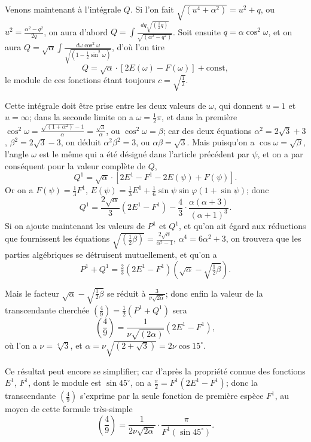 \documentclass{article}
\begin{document}
Venons maintenant à l'intégrale $Q$. Si l'on fait $\sqrt{(u^{4}+\alpha^{2})}=u^{2}+q$, ou $u^{2}=\frac{\alpha^{2}-q^{2}}{2q}$, on aura d'abord $Q=\displaystyle\int\frac{dq\sqrt{(\frac{1}{2}q)}}{\sqrt{(\alpha^{2}-q^{2})}}$. Soit ensuite $q=\alpha\cos^{2}\omega$, et on aura $Q=\sqrt{\alpha}\displaystyle\int\frac{d\omega\cos^{2}\omega}{\sqrt{(1-\frac{1}{2}\sin^{2}\omega)}}$, d'où l'on tire
\[ Q=\sqrt{\alpha}\cdot[2E(\omega)-F(\omega)]+\text{const}, \]
le module de ces fonctions étant toujours $c=\sqrt{\frac{1}{2}}$.

Cette intégrale doit être prise entre les deux valeurs de $\omega$, qui donnent $u=1$ et $u=\infty$; dans la seconde limite on a $\omega=\frac{1}{2}\pi$, et dans la première $\cos^{2}\omega=\frac{\sqrt{(1+\alpha^{2})}-1}{\alpha}=\frac{\sqrt{3}}{\alpha}$, ou $\cos^{2}\omega=\beta$; car des deux équations $\alpha^{2}=2\sqrt{3}+3$, $\beta^{2}=2\sqrt{3}-3$, on déduit $\alpha^{2}\beta^{2}=3$, ou $\alpha\beta=\sqrt{3}$. Mais puisqu'on a $\cos\omega=\sqrt{\beta}$, l'angle $\omega$ est le même qui a été désigné dans l'article précédent par $\psi$, et on a par conséquent pour la valeur complète de $Q$,
\[ Q^{1}=\sqrt{\alpha}\cdot[2E^{1}-F^{1}-2E(\psi)+F(\psi)]. \]
Or on a $F(\psi)=\frac{1}{3}F^{1}$, $E(\psi)=\frac{1}{3}E^{1}+\frac{1}{6}\sin\psi\sin\varphi(1+\sin\psi)$; donc
\[ Q^{1}=\frac{2\sqrt{\alpha}}{3}(2E^{1}-F^{1})-\frac{4}{3}\cdot\frac{\alpha(\alpha+3)}{(\alpha+1)^{3}}. \]
Si on ajoute maintenant les valeurs de $P^{1}$ et $Q^{1}$, et qu'on ait égard aux réductions que fournissent les équations $\sqrt{(\frac{1}{2}\beta)}=\frac{2\sqrt{\alpha}}{\alpha^{2}-1}$, $\alpha^{4}=6\alpha^{2}+3$, on trouvera que les parties algébriques se détruisent mutuellement, et qu'on a
\[ P^{1}+Q^{1}=\tfrac{2}{3}(2E^{1}-F^{1})(\sqrt{\alpha}-\sqrt{\tfrac{1}{2}\beta}). \]

Mais le facteur $\sqrt{\alpha}-\sqrt{\frac{1}{2}\beta}$ se réduit à $\frac{3}{\nu\sqrt{2\alpha}}$; donc enfin la valeur de la transcendante cherchée $\left(\frac{4}{9}\right)=\frac{1}{2}(P^{1}+Q^{1})$ sera
\[ \left(\frac{4}{9}\right)=\frac{1}{\nu\sqrt{(2\alpha)}}(2E^{1}-F^{1}), \]
où l'on a $\nu=\sqrt[4]{3}$, et $\alpha=\nu\sqrt{(2+\sqrt{3})}=2\nu\cos 15^{\circ}$.

Ce résultat peut encore se simplifier; car d'après la propriété connue des fonctions $E^{1}$, $F^{1}$, dont le module est $\sin 45^{\circ}$, on a $\frac{\pi}{2}=F^{1}(2E^{1}-F^{1})$; donc la transcendante $\left(\frac{4}{9}\right)$ s'exprime par la seule fonction de première espèce $F^{1}$, au moyen de cette formule très-simple
\[ \left(\frac{4}{9}\right)=\frac{1}{2\nu\sqrt{2\alpha}}\cdot\frac{\pi}{F^{1}(\sin 45^{\circ})}. \]
\end{document}
